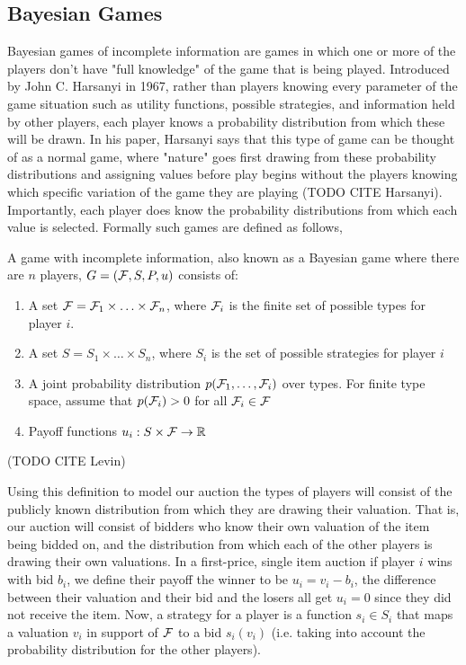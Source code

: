 \documentclass[12pt,twoside]{reedthesis}
\begin{document}
\subsection{Bayesian Games}
Bayesian games of incomplete information are games in which one or more of the players don't have "full knowledge" of the game that is being played. Introduced by John C. Harsanyi in 1967, rather than players knowing every parameter of the game situation such as utility functions, possible strategies, and information held by other players, each player knows a probability distribution from which these will be drawn. In his paper, Harsanyi says that this type of game can be thought of as a normal game, where "nature" goes first drawing from these probability distributions and assigning values before play begins without the players knowing which specific variation of the game they are playing (TODO CITE Harsanyi). Importantly, each player does know the probability distributions from which each value is selected. Formally such games are defined as follows, 

\begin{dfn}
	A game with incomplete information, also known as a Bayesian game where there are $n$ players, $G = (\mathcal{F}, S, P, u)$ %
	consists of:
	\begin{enumerate}
		\item A set $\mathcal{F} = \mathcal{F}_1 \times \ldots \times \mathcal{F}_n$, where $\mathcal{F}_i$ is the finite set of possible types for player $i$.
		\item A set $S = S_1 \times \ldots \times S_n$, where $S_i$ is the set of possible strategies for player $i$
		\item A joint probability distribution $p(\mathcal{F}_1, \dots , \mathcal{F}_i)$ over types. For finite type space, assume that $p(\mathcal{F}_i) > 0$ for all $\mathcal{F}_i \in \mathcal{F}$
		\item Payoff functions $u_i : S \times \mathcal{F} \rightarrow \mathbb{R}$
	\end{enumerate} 
\end{dfn} (TODO CITE Levin)

Using this definition to model our auction the types of players will consist of the publicly known distribution from which they are drawing their valuation. That is, our auction will consist of bidders who know their own valuation of the item being bidded on, and the distribution from which each of the other players is drawing their own valuations. In a first-price, single item auction if player $i$ wins with bid $b_i$, we define their payoff the winner to be $u_i = v_i - b_i$, the difference between their valuation and their bid and the losers all get $u_i = 0$ since they did not receive the item. Now, a strategy for a player is a function $s_i \in S_i$ that maps a valuation $v_i$ in support of $\mathcal{F}$ to a bid $s_i(v_i)$ (i.e. taking into account the probability distribution for the other players). 
\end{document}
